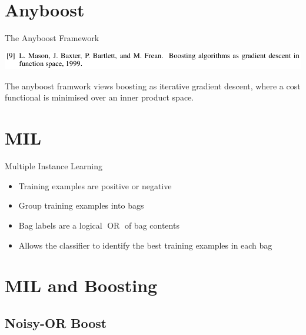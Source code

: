 \documentclass{beamer}
\begin{document}
	\section{Anyboost}


	\begin{frame}{The Anyboost Framework}
		\begin{center}
			\includegraphics[width=1\textwidth]{anyboost-citation.png}

			The anyboost framwork views boosting as iterative gradient
			descent, where a cost functional is minimised over an inner
			product space.

		\end{center}
	\end{frame}

	


	\section{MIL}

	\begin{frame}{Multiple Instance Learning}
		\begin{itemize}
			\item Training examples are positive or negative
			\item Group training examples into bags
			\item Bag labels are a logical \(\operatorname{OR}\) of bag contents
			\item Allows the classifier to identify the best training examples in each bag
		\end{itemize}
	\end{frame}


	\section{MIL and Boosting}

	\subsection{Noisy-OR Boost}
\end{document}
